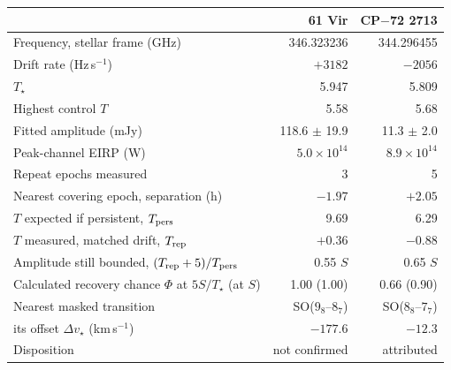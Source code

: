 \begin{tabular}{@{}>{\raggedright\arraybackslash}p{}@{~~}r@{~~}r@{}}
\hline
 & 61 Vir & CP$-$72 2713 \\
\hline
Frequency, stellar frame (GHz) & 346.323236 & 344.296455 \\
Drift rate (Hz\,s$^{-1}$) & $+3182$ & $-2056$ \\
$T_\star$ & 5.947 & 5.809 \\
Highest control $T$ & 5.58 & 5.68 \\
Fitted amplitude (mJy) & 118.6 $\pm$ 19.9 & 11.3 $\pm$ 2.0 \\
Peak-channel EIRP (W) & $5.0 \times 10^{14}$ & $8.9 \times 10^{14}$ \\
Repeat epochs measured & 3 & 5 \\
Nearest covering epoch, separation (h) & $-1.97$ & $+2.05$ \\
$T$ expected if persistent, $T_{\rm pers}$ & 9.69 & 6.29 \\
$T$ measured, matched drift, $T_{\rm rep}$ & $+0.36$ & $-0.88$ \\
Amplitude still bounded, $(T_{\rm rep}+5)/T_{\rm pers}$ & 0.55 $S$ & 0.65 $S$ \\
Calculated recovery chance $\Phi$ at $5S/T_\star$ (at $S$) & 1.00 (1.00) & 0.66 (0.90) \\
Nearest masked transition & SO($9_{8}$--$8_{7}$) & SO($8_{8}$--$7_{7}$) \\
\quad its offset $\Delta v_\star$ (km\,s$^{-1}$) & $-177.6$ & $-12.3$ \\
Disposition & not confirmed & attributed \\
\hline
\end{tabular}
